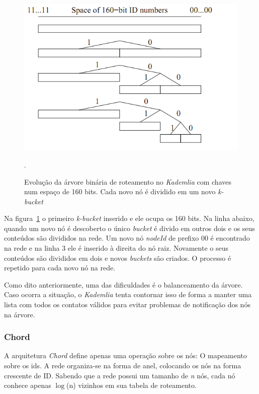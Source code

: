 \begin{figure}
	\centering
	\includegraphics[scale=0.6]{images/kademlia-k-bucket.png}
	\caption{Evolução da árvore binária de roteamento no \emph{Kademlia} com chaves num espaço de 160 bits. Cada novo nó é dividido em um novo \emph{k-bucket}}.
	\label{fig:kademlia-k-bucket}
\end{figure}

Na figura~\ref{fig:kademlia-k-bucket} o primeiro \emph{k-bucket} inserido e ele ocupa os 160 bits. Na linha abaixo, quando um novo nó é descoberto o único \emph{bucket} é divido em outros dois e os seus conteúdos são divididos na rede. Um novo nó \emph{nodeId} de prefixo 00 é encontrado na rede e na linha 3 ele é inserido à direita do nó raiz. Novamente o seus conteúdos são divididos em dois e novos \emph{buckets} são criados. O processo é repetido para cada novo nó na rede.

Como dito anteriormente, uma das dificuldades é o balanceamento da árvore. Caso ocorra a situação, o \emph{Kademlia} tenta contornar isso de forma a manter uma lista com todos os contatos válidos para evitar problemas de notificação dos nós na árvore.

\subsubsection{Chord}

A arquitetura \emph{Chord} define apenas uma operação sobre os nós: O mapeamento sobre os ids. A rede organiza-se na forma de anel, colocando os nós na forma crescente de ID. Sabendo que a rede possui um tamanho de \emph{n} nós, cada nó conhece apenas $\log$(n) vizinhos em sua tabela de roteamento.

